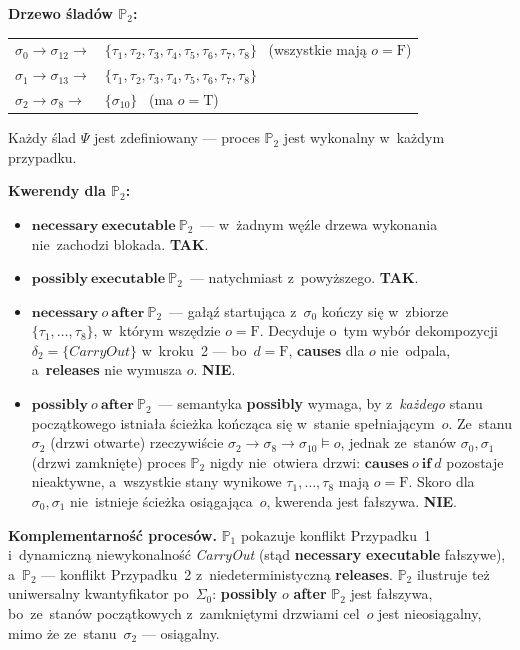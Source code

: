 \documentclass[11pt,a4paper]{article}
\newcommand{\causes}{\textbf{causes}}
\newcommand{\aft}{\textbf{after}}
\renewcommand{\iff}{\textbf{if}}
\newcommand{\releases}{\textbf{releases}}
\newcommand{\necessary}{\textbf{necessary}}
\newcommand{\possibly}{\textbf{possibly}}
\newcommand{\executable}{\textbf{executable}}
\theoremstyle{definition}
\begin{document}
\medskip
\noindent\textbf{Drzewo śladów $\mathbb{P}_2$:}
\begin{center}
\begin{tabular}{@{}l@{\ }l@{}}
$\sigma_0 \to \sigma_{12} \to$ & $\{\tau_1, \tau_2, \tau_3, \tau_4, \tau_5, \tau_6, \tau_7, \tau_8\}$
    \ (wszystkie mają $o = \text{F}$) \\
$\sigma_1 \to \sigma_{13} \to$ & $\{\tau_1, \tau_2, \tau_3, \tau_4, \tau_5, \tau_6, \tau_7, \tau_8\}$ \\
$\sigma_2 \to \sigma_{8} \to$  & $\{\sigma_{10}\}$
    \ (ma $o = \text{T}$) \\
\end{tabular}
\end{center}
Każdy ślad $\Psi$ jest zdefiniowany --- proces $\mathbb{P}_2$ jest wykonalny w~każdym przypadku.

\medskip
\noindent\textbf{Kwerendy dla $\mathbb{P}_2$:}
\begin{itemize}
  \item $\necessary\ \executable\ \mathbb{P}_2$~---
    w~żadnym węźle drzewa wykonania nie~zachodzi blokada. \textbf{TAK}.

  \item $\possibly\ \executable\ \mathbb{P}_2$~---
    natychmiast z~powyższego. \textbf{TAK}.

  \item $\necessary\ o\ \aft\ \mathbb{P}_2$~---
    gałąź startująca z~$\sigma_0$ kończy się w~zbiorze $\{\tau_1, \ldots, \tau_8\}$,
    w~którym wszędzie $o = \text{F}$. Decyduje o~tym wybór dekompozycji
    $\delta_2 = \{\mathit{CarryOut}\}$ w~kroku~2 --- bo~$d = \text{F}$,
    \causes{} dla $o$ nie~odpala, a~\releases{} nie wymusza $o$. \textbf{NIE}.

  \item $\possibly\ o\ \aft\ \mathbb{P}_2$~---
    semantyka \possibly{} wymaga, by z~\emph{każdego} stanu początkowego istniała
    ścieżka kończąca się w~stanie spełniającym~$o$. Ze~stanu $\sigma_2$ (drzwi otwarte)
    rzeczywiście $\sigma_2 \to \sigma_8 \to \sigma_{10} \models o$, jednak ze~stanów
    $\sigma_0, \sigma_1$ (drzwi zamknięte) proces $\mathbb{P}_2$ nigdy nie~otwiera drzwi:
    $\causes\ o\ \iff\ d$ pozostaje nieaktywne, a~wszystkie stany wynikowe
    $\tau_1,\ldots,\tau_8$ mają $o = \text{F}$. Skoro dla~$\sigma_0, \sigma_1$ nie~istnieje
    ścieżka osiągająca~$o$, kwerenda jest fałszywa. \textbf{NIE}.
\end{itemize}

\medskip
\noindent \textbf{Komplementarność procesów.} $\mathbb{P}_1$ pokazuje konflikt Przypadku~1
i~dynamiczną niewykonalność \textit{CarryOut} (stąd \necessary{} \executable{} fałszywe),
a~$\mathbb{P}_2$ --- konflikt Przypadku~2 z~niedeterministyczną \releases{}. $\mathbb{P}_2$
ilustruje też uniwersalny kwantyfikator po~$\Sigma_0$: \possibly{} $o$ \aft{} $\mathbb{P}_2$
jest fałszywa, bo~ze~stanów początkowych z~zamkniętymi drzwiami cel~$o$ jest nieosiągalny,
mimo że ze~stanu~$\sigma_2$ --- osiągalny.
\end{document}
